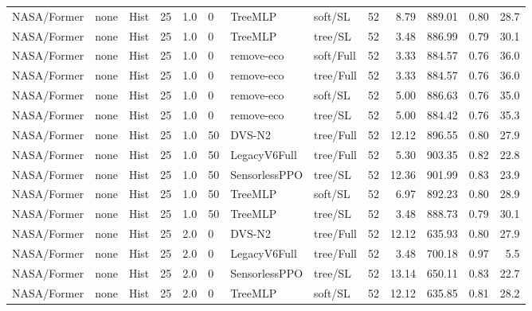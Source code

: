 \documentclass[10pt,a4paper]{article}
\begin{document}
\begin{landscape}
\begin{longtable}{llllllllrrrrr}
NASA/Former & none & Hist & 25 & 1.0 & 0 & TreeMLP & soft/SL & 52 & 8.79 & 889.01 & 0.80 & 28.7 \\

NASA/Former & none & Hist & 25 & 1.0 & 0 & TreeMLP & tree/SL & 52 & 3.48 & 886.99 & 0.79 & 30.1 \\

NASA/Former & none & Hist & 25 & 1.0 & 0 & remove-eco & soft/Full & 52 & 3.33 & 884.57 & 0.76 & 36.0 \\

NASA/Former & none & Hist & 25 & 1.0 & 0 & remove-eco & tree/Full & 52 & 3.33 & 884.57 & 0.76 & 36.0 \\

NASA/Former & none & Hist & 25 & 1.0 & 0 & remove-eco & soft/SL & 52 & 5.00 & 886.63 & 0.76 & 35.0 \\

NASA/Former & none & Hist & 25 & 1.0 & 0 & remove-eco & tree/SL & 52 & 5.00 & 884.42 & 0.76 & 35.3 \\

NASA/Former & none & Hist & 25 & 1.0 & 50 & DVS-N2 & tree/Full & 52 & 12.12 & 896.55 & 0.80 & 27.9 \\

NASA/Former & none & Hist & 25 & 1.0 & 50 & LegacyV6Full & tree/Full & 52 & 5.30 & 903.35 & 0.82 & 22.8 \\

NASA/Former & none & Hist & 25 & 1.0 & 50 & SensorlessPPO & tree/SL & 52 & 12.36 & 901.99 & 0.83 & 23.9 \\

NASA/Former & none & Hist & 25 & 1.0 & 50 & TreeMLP & soft/SL & 52 & 6.97 & 892.23 & 0.80 & 28.9 \\

NASA/Former & none & Hist & 25 & 1.0 & 50 & TreeMLP & tree/SL & 52 & 3.48 & 888.73 & 0.79 & 30.1 \\

NASA/Former & none & Hist & 25 & 2.0 & 0 & DVS-N2 & tree/Full & 52 & 12.12 & 635.93 & 0.80 & 27.9 \\

NASA/Former & none & Hist & 25 & 2.0 & 0 & LegacyV6Full & tree/Full & 52 & 3.48 & 700.18 & 0.97 & 5.5 \\

NASA/Former & none & Hist & 25 & 2.0 & 0 & SensorlessPPO & tree/SL & 52 & 13.14 & 650.11 & 0.83 & 22.7 \\

NASA/Former & none & Hist & 25 & 2.0 & 0 & TreeMLP & soft/SL & 52 & 12.12 & 635.85 & 0.81 & 28.2 \\


\end{longtable}
\end{landscape}
\end{document}
